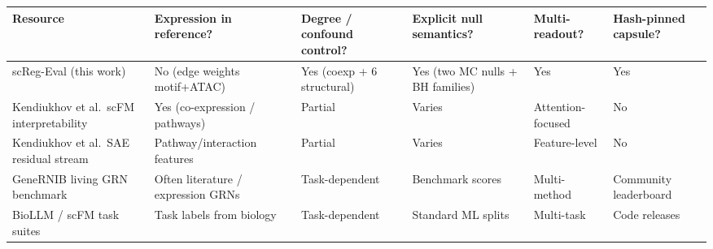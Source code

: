 {\small
\begin{tabularx}{\linewidth}{@{}>{\raggedright\arraybackslash}p{2.15cm}>{\centering\arraybackslash}X>{\centering\arraybackslash}X>{\centering\arraybackslash}X>{\centering\arraybackslash}X>{\centering\arraybackslash}X@{}}
\toprule
Resource & Expression in reference? & Degree / confound control? & Explicit null semantics? & Multi-readout? & Hash-pinned capsule? \\
\midrule
scReg-Eval (this work) & No (edge weights motif+ATAC) & Yes (coexp + 6 structural) & Yes (two MC nulls + BH families) & Yes & Yes \\
Kendiukhov et al.\ scFM interpretability & Yes (co-expression / pathways) & Partial & Varies & Attention-focused & No \\
Kendiukhov et al.\ SAE residual stream & Pathway/interaction features & Partial & Varies & Feature-level & No \\
GeneRNIB living GRN benchmark & Often literature / expression GRNs & Task-dependent & Benchmark scores & Multi-method & Community leaderboard \\
BioLLM / scFM task suites & Task labels from biology & Task-dependent & Standard ML splits & Multi-task & Code releases \\
\bottomrule
\end{tabularx}
}
